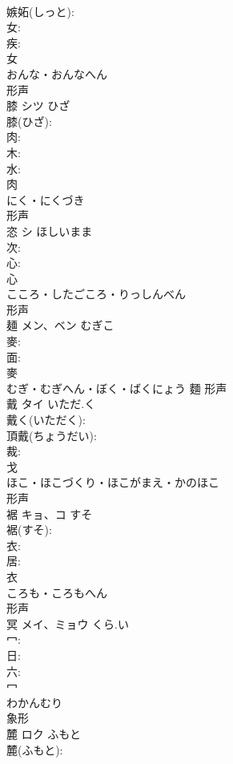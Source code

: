 \documentclass[8pt]{extreport}
\begin{document}
\begin{CJK}{UTF8}{min}
\\	嫉妬(しっと): 
\\	女: 
\\	疾: 
\\	女	
\\	おんな・おんなへん	
\\	形声 
\\	膝	シツ	ひざ		
\\	膝(ひざ): 
\\	肉: 
\\	木: 
\\	水: 
\\	肉	
\\	にく・にくづき	
\\	形声 
\\	恣	シ	ほしいまま		
\\	次: 
\\	心: 
\\	心	
\\	こころ・したごころ・りっしんべん	
\\	形声 
\\	麺	メン、ベン	むぎこ		
\\	麥: 
\\	面: 
\\	麥	
\\	むぎ・むぎへん・ぼく・ばくにょう	麵	形声 
\\	戴	タイ	いただ.く		
\\	戴く(いただく): 
\\	頂戴(ちょうだい): 
\\	裁: 
\\	戈	
\\	ほこ・ほこづくり・ほこがまえ・かのほこ	
\\	形声 
\\	裾	キョ、コ	すそ		
\\	裾(すそ): 
\\	衣: 
\\	居: 
\\	衣	
\\	ころも・ころもへん	
\\	形声 
\\	冥	メイ、ミョウ	くら.い		
\\	冖: 
\\	日: 
\\	六: 
\\	冖	
\\	わかんむり	
\\	象形 
\\	麓	ロク	ふもと		
\\	麓(ふもと): 

\end{CJK}
\end{document}

